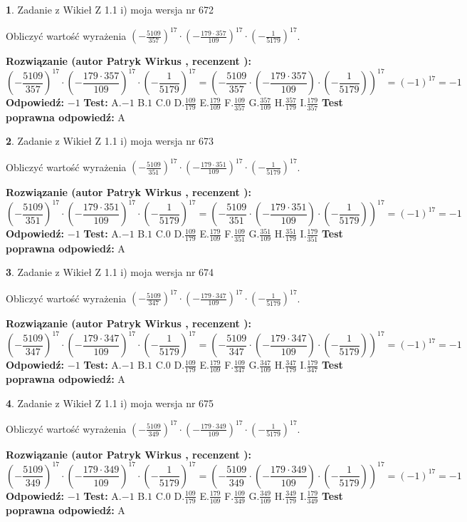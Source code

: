 \documentclass[12pt, a4paper]{article}
\theoremstyle{definition} %
\newtheorem{zad}{}
\newcommand{\zadStart}[1]{\begin{zad}#1\newline}
\newcommand{\zadStop}{\end{zad}}
\newcommand{\rozwStart}[2]{\noindent \textbf{Rozwiązanie (autor #1 , recenzent #2): }\newline}
\newcommand{\rozwStop}{\newline}
\newcommand{\odpStart}{\noindent \textbf{Odpowiedź:}\newline}
\newcommand{\odpStop}{\newline}
\newcommand{\testStart}{\noindent \textbf{Test:}\newline}
\newcommand{\testStop}{\newline}
\newcommand{\kluczStart}{\noindent \textbf{Test poprawna odpowiedź:}\newline}
\newcommand{\kluczStop}{\newline}
\begin{document}
\zadStart{Zadanie z Wikieł Z 1.1 i) moja wersja nr 672}

Obliczyć wartość wyrażenia $(-\frac{5109}{357})^{17} \cdot (-\frac{179 \cdot 357}{109})^{17} \cdot (-\frac{1}{5179})^{17}$.
\zadStop
\rozwStart{Patryk Wirkus}{}
$$(-\frac{5109}{357})^{17} \cdot (-\frac{179 \cdot 357}{109})^{17} \cdot (-\frac{1}{5179})^{17} = (-\frac{5109}{357} \cdot (-\frac{179 \cdot 357}{109}) \cdot (-\frac{1}{5179}))^{17} = (-1)^{17} = -1$$
\rozwStop
\odpStart
$-1$
\odpStop
\testStart
A.$-1$ B.$1$ C.$0$ D.$\frac{109}{179}$ E.$\frac{179}{109}$
F.$\frac{109}{357}$ G.$\frac{357}{109}$
H.$\frac{357}{179}$
I.$\frac{179}{357}$
\testStop
\kluczStart
A
\kluczStop



\zadStart{Zadanie z Wikieł Z 1.1 i) moja wersja nr 673}

Obliczyć wartość wyrażenia $(-\frac{5109}{351})^{17} \cdot (-\frac{179 \cdot 351}{109})^{17} \cdot (-\frac{1}{5179})^{17}$.
\zadStop
\rozwStart{Patryk Wirkus}{}
$$(-\frac{5109}{351})^{17} \cdot (-\frac{179 \cdot 351}{109})^{17} \cdot (-\frac{1}{5179})^{17} = (-\frac{5109}{351} \cdot (-\frac{179 \cdot 351}{109}) \cdot (-\frac{1}{5179}))^{17} = (-1)^{17} = -1$$
\rozwStop
\odpStart
$-1$
\odpStop
\testStart
A.$-1$ B.$1$ C.$0$ D.$\frac{109}{179}$ E.$\frac{179}{109}$
F.$\frac{109}{351}$ G.$\frac{351}{109}$
H.$\frac{351}{179}$
I.$\frac{179}{351}$
\testStop
\kluczStart
A
\kluczStop



\zadStart{Zadanie z Wikieł Z 1.1 i) moja wersja nr 674}

Obliczyć wartość wyrażenia $(-\frac{5109}{347})^{17} \cdot (-\frac{179 \cdot 347}{109})^{17} \cdot (-\frac{1}{5179})^{17}$.
\zadStop
\rozwStart{Patryk Wirkus}{}
$$(-\frac{5109}{347})^{17} \cdot (-\frac{179 \cdot 347}{109})^{17} \cdot (-\frac{1}{5179})^{17} = (-\frac{5109}{347} \cdot (-\frac{179 \cdot 347}{109}) \cdot (-\frac{1}{5179}))^{17} = (-1)^{17} = -1$$
\rozwStop
\odpStart
$-1$
\odpStop
\testStart
A.$-1$ B.$1$ C.$0$ D.$\frac{109}{179}$ E.$\frac{179}{109}$
F.$\frac{109}{347}$ G.$\frac{347}{109}$
H.$\frac{347}{179}$
I.$\frac{179}{347}$
\testStop
\kluczStart
A
\kluczStop



\zadStart{Zadanie z Wikieł Z 1.1 i) moja wersja nr 675}

Obliczyć wartość wyrażenia $(-\frac{5109}{349})^{17} \cdot (-\frac{179 \cdot 349}{109})^{17} \cdot (-\frac{1}{5179})^{17}$.
\zadStop
\rozwStart{Patryk Wirkus}{}
$$(-\frac{5109}{349})^{17} \cdot (-\frac{179 \cdot 349}{109})^{17} \cdot (-\frac{1}{5179})^{17} = (-\frac{5109}{349} \cdot (-\frac{179 \cdot 349}{109}) \cdot (-\frac{1}{5179}))^{17} = (-1)^{17} = -1$$
\rozwStop
\odpStart
$-1$
\odpStop
\testStart
A.$-1$ B.$1$ C.$0$ D.$\frac{109}{179}$ E.$\frac{179}{109}$
F.$\frac{109}{349}$ G.$\frac{349}{109}$
H.$\frac{349}{179}$
I.$\frac{179}{349}$
\testStop
\kluczStart
A
\kluczStop
\end{document}
